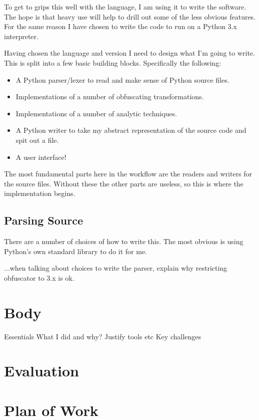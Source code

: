 \documentclass{report}
\begin{document}
To get to grips this well with the language, I am using it to write the software. The hope is that heavy use will help to
drill out some of the less obvious features. For the same reason I have chosen to write the code to run on a Python 3.x
interpreter.

Having chosen the language and version I need to design what I'm going to write. This is split into a few basic building
blocks. Specifically the following:

\begin{itemize}
\item A Python parser/lexer to read and make sense of Python source files.
\item Implementations of a number of obfuscating transformations.
\item Implementations of a number of analytic techniques.
\item A Python writer to take my abstract representation of the source code and spit out a file.
\item A user interface!
\end{itemize}

The most fundamental parts here in the workflow are the readers and writers for the source files.
Without these the other parts are useless, so this is where the implementation begins.

\subsection{Parsing Source}

There are a number of choices of how to write this. The most obvious is using Python's own standard library to do it for me.


...when talking about choices to write the parser, explain why restricting obfuscator to 3.x is ok.

\section{Body}

Essentials
What I did and why?
Justify tools etc
Key challenges

\section{Evaluation}



\section{Plan of Work}
\end{document}

